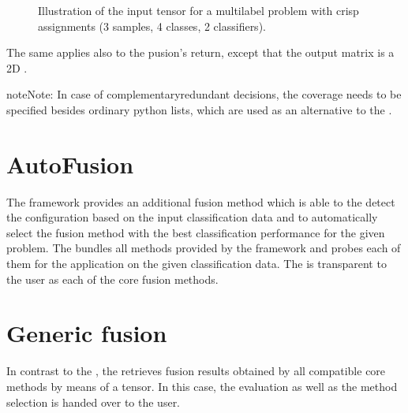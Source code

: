 \documentclass[letterpaper,10pt,english]{sphinxmanual}
\begin{document}
\begin{figure}[htbp]
\centering
\capstart

\noindent{}
\caption{Illustration of the input tensor for a multilabel problem with crisp assignments
(3 samples, 4 classes, 2 classifiers).}\label{\detokenize{overview:id2}}\label{\detokenize{overview:fig-input-tensor-illustration}}\end{figure}

\sphinxAtStartPar
The same applies also to the pusion’s return, except that the output matrix is a 2D .

\begin{sphinxadmonition}{note}{Note:}
\sphinxAtStartPar
In case of complementary\sphinxhyphen{}redundant decisions, the coverage needs to be specified besides ordinary python lists,
which are used as an alternative to the .
\end{sphinxadmonition}


\section{AutoFusion}
\label{\detokenize{overview:autofusion}}
\sphinxAtStartPar
The framework provides an additional fusion method {\hyperref[\detokenize{pusion.auto.auto_combiner:ac-cref}]{}} which is able to the detect the configuration
based on the input classification data and to automatically select the fusion method with the best classification
performance for the given problem.
The  bundles all methods provided by the framework and probes each of them for the application on the
given classification data.
The  is transparent to the user as each of the core fusion methods.


\section{Generic fusion}
\label{\detokenize{overview:generic-fusion}}
\sphinxAtStartPar
In contrast to the , the {\hyperref[\detokenize{pusion.auto.generic_combiner:gc-cref}]{}} retrieves fusion results obtained by all
compatible core methods by means of a  tensor. In this case, the evaluation as well as the method
selection is handed over to the user.
\end{document}
